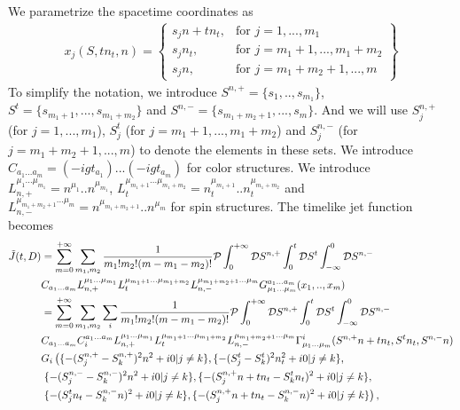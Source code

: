 \documentclass[a4paper,11pt]{article}
\begin{document}
We parametrize the spacetime coordinates as
\begin{align}
x_j(S,tn_t,n)= 
\left\{
    \begin{array}{lr}
        s_j n + t n_t, & \text{for } j=1,...,m_1\\
        s_j n_t, & \text{for } j=m_1+1,...,m_1+m_2\\
        s_j n, & \text{for } j=m_1+m_2+1,...,m 
    \end{array}
\right\}
\end{align}
To simplify the notation, we introduce $S^{n,+}=\{s_1,..,s_{m_1}\}$, $S^{t}=\{s_{m_1 + 1},...,s_{m_1 + m_2}\}$ and $S^{n,-}=\{s_{m_1 + m_2 + 1},...,s_{m}\}$. And we will use $S^{n,+}_j$ (for $j=1,...,m_1$), $S^{t}_j$ (for $j=m_1+1,...,m_1+m_2$) and $S^{n,-}_j$ (for $j=m_1+m_2+1,...,m$) to denote the elements in these sets. We introduce $C_{a_1...a_m}=(-i g t_{a_1})...(-i g t_{a_{m}})$ for color structures. We introduce $L^{\mu_1 ... \mu_{m_1}}_{n,+}=n^{\mu_1}..n^{\mu_{m_1}}$, $L^{\mu_{m_1+1} ... \mu_{m_1+m_2}}_{t}=n_t^{\mu_{m_1+1}}..n_t^{\mu_{m_1+m_2}}$ and $L^{\mu_{m_1+m_2+1} ... \mu_{m}}_{n,-}=n^{\mu_{m_1+m_2+1}}..n^{\mu_{m}}$ for spin structures. The timelike jet function becomes
\begin{align}
\tilde J( t,D)&=\sum_{m=0}^{+\infty} \sum_{m_1,m_2} \frac{1}{m_1! m_2! (m-m_1-m_2)!} {\cal P} \int^{+ \infty}_{0} {\cal D} S^{n,+} \int^{t}_{0} {\cal D} S^{t} 
\int^{0}_{-\infty} {\cal D} S^{n,-} \nonumber\\ 
&C_{a_1...a_m} L^{\mu_1 ... \mu_{m_1}}_{n,+} L^{\mu_{m_1+1} ... \mu_{m_1+m_2}}_{t} L^{\mu_{m_1+m_2+1} ... \mu_{m}}_{n,-} G_{\mu_1...\mu_m}^{a_1 ... a_m}(x_1,..,x_m) \nonumber\\ 
&=\sum_{m=0}^{+\infty} \sum_{m_1,m_2} \sum_{i} \frac{1}{m_1! m_2! (m-m_1-m_2)!} {\cal P} \int^{+ \infty}_{0} {\cal D} S^{n,+} \int^{t}_{0} {\cal D} S^{t} 
\int^{0}_{-\infty} {\cal D} S^{n,-} \nonumber\\ 
&C_{a_1...a_m} C_{i}^{a_1 ... a_m} L^{\mu_1 ... \mu_{m_1}}_{n,+} L^{\mu_{m_1+1} ... \mu_{m_1+m_2}}_{t} L^{\mu_{m_1+m_2+1} ... \mu_{m}}_{n,-} \Gamma^{i}_{\mu_1...\mu_m}(S^{n,+} n + t n_t,S^{t} n_t,S^{n,-} n) \nonumber\\ 
&G_{i}\left(\{-(S^{n,+}_j-S^{n,+}_k)^2 n^2+i0|j\neq k\},\{-(S^{t}_j-S^{t}_k)^2 n_t^2+i0|j\neq k\}, \right. \nonumber\\
& \left. \{-(S^{n,-}_j-S^{n,-}_k)^2 n^2+i0|j\neq k\},
\{-(S^{n,+}_j n + t n_t - S^{t}_k n_t)^2+i0|j\neq k\}, \right. \nonumber\\
& \left. \{-(S^{t}_j n_t - S^{n,-}_k n)^2+i0|j\neq k\},\{-(S^{n,+}_j n + t n_t - S^{n,-}_k n)^2+i0|j\neq k\} \right),
\end{align}
\end{document}
